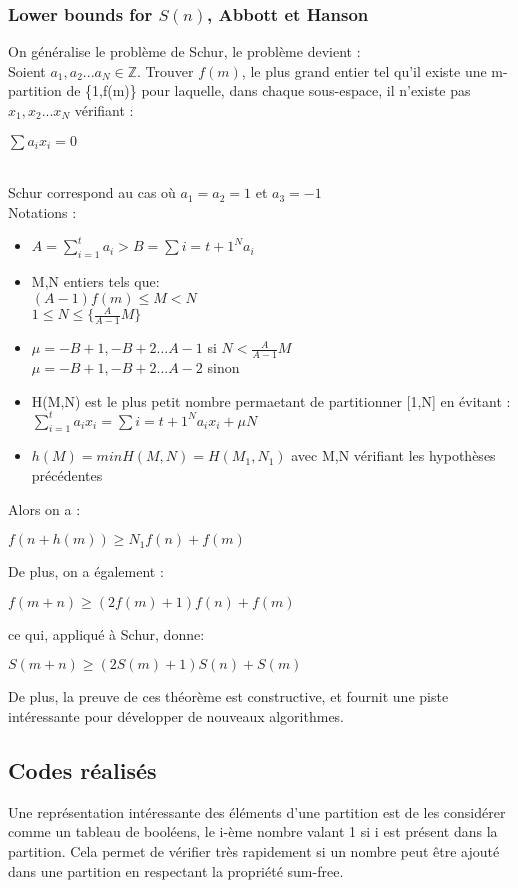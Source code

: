 \documentclass{report}
\begin{document}
\subsubsection{Lower bounds for $S(n)$, Abbott et Hanson}
On généralise le problème de Schur, le problème devient :
\\ Soient $a_1, a_2... a_N \in \mathbb{Z}$. Trouver $f(m)$, le plus grand entier tel qu'il existe une m-partition de \{1,f(m)\} pour laquelle, dans chaque sous-espace, il n'existe pas $x_1, x_2... x_N$ vérifiant :
\begin{center}
    $\sum a_i x_i = 0$
\end{center}
\\ Schur correspond au cas où $a_1=a_2=1$ et $a_3=-1$ 
\\Notations :
\begin{itemize}
    \item $A=\sum_{i=1}^{t}a_i > B=\sum{i=t+1}^{N}a_i$
    \item M,N entiers tels que:
    \\ \tabto{1cm} $(A-1)f(m) \leq M<N$
    \\ \tabto{1cm} $1 \leq N \leq \{ \frac{A}{A-1}M \} $
    \item $ \mu = -B+1, -B+2...A-1 $ si $N< \frac{A}{A-1}M $
    \\ $ \mu = -B+1, -B+2...A-2 $ sinon
    \item H(M,N) est le plus petit nombre permaetant de partitionner [1,N] en évitant :
    \\  \tabto{1cm} $ \sum_{i=1}^{t}a_ix_i = \sum{i=t+1}^{N}a_ix_i + \mu N $
    \item $ h(M) = min H(M,N) = H(M_1,N_1) $ avec M,N vérifiant les hypothèses précédentes
\end{itemize}
Alors on a :
\begin{center}
    $f(n+h(m)) \geq N_1 f(n) + f(m)$
\end{center}
De plus, on a également :
\begin{center}
   $ f(m+n) \geq (2f(m)+1)f(n) + f(m) $
\end{center}
ce qui, appliqué à Schur, donne:
\begin{center}
   $ S(m+n) \geq (2S(m)+1)S(n) + S(m) $
\end{center}
De plus, la preuve de ces théorème est constructive, et fournit une piste intéressante pour développer de nouveaux algorithmes.


\subsection{Codes réalisés} 
Une représentation intéressante des éléments d'une partition est de les considérer comme un tableau de booléens, le i-ème nombre valant 1 si i est présent dans la partition. Cela permet de vérifier très rapidement si un nombre peut être ajouté dans une partition en respectant la propriété sum-free.
\end{document}
